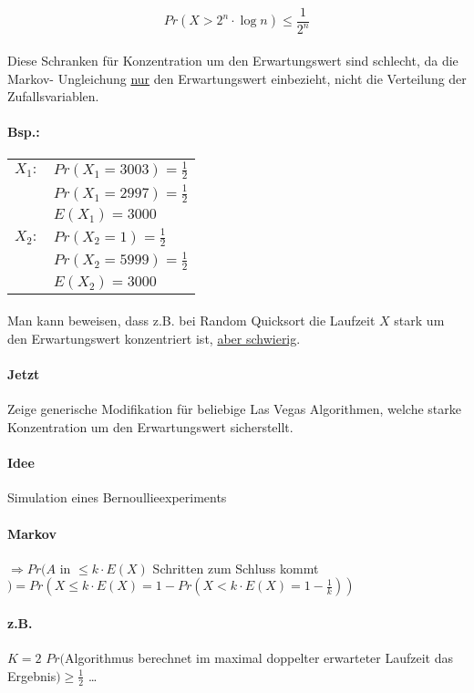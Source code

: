 $$ Pr(X > 2^n \cdot \log n) \leq \frac{1}{2^n} $$

\paragraph*{} Diese Schranken für Konzentration um den Erwartungswert sind schlecht, da die Markov- Ungleichung \underline{nur} den Erwartungswert einbezieht, nicht die Verteilung der Zufallsvariablen.

\paragraph*{Bsp.:}
\begin{tabular}{l l}
$X_1 :$ & $Pr(X_1 = 3003) = \frac{1}{2}$ \\
 & $Pr(X_1 = 2997) = \frac{1}{2}$ \\
 & $E(X_1) = 3000$ \\
$X_2 :$ & $Pr(X_2 = 1) = \frac{1}{2}$ \\
 & $Pr(X_2 = 5999) = \frac{1}{2}$ \\
 & $E(X_2) = 3000$ \\
\end{tabular} 

\paragraph*{} Man kann beweisen, dass z.B. bei Random Quicksort die Laufzeit $X$ stark um den Erwartungswert konzentriert ist,  \underline{aber schwierig}.

\paragraph*{Jetzt} Zeige generische Modifikation für beliebige Las Vegas Algorithmen, welche starke Konzentration um den Erwartungswert sicherstellt.

\paragraph*{Idee} Simulation eines Bernoullieexperiments \\

\paragraph*{Markov} $\Rightarrow Pr(A$ in $\leq k \cdot E(X)$ Schritten zum Schluss kommt $) = Pr(X \leq k \cdot E(X) = 1 - Pr(X<k \cdot E(X) = 1 - \frac{1}{k}))$ 

\paragraph*{z.B.} $K=2$ $Pr($Algorithmus berechnet im maximal doppelter erwarteter Laufzeit das Ergebnis$) \geq \frac{1}{2}$ \dots